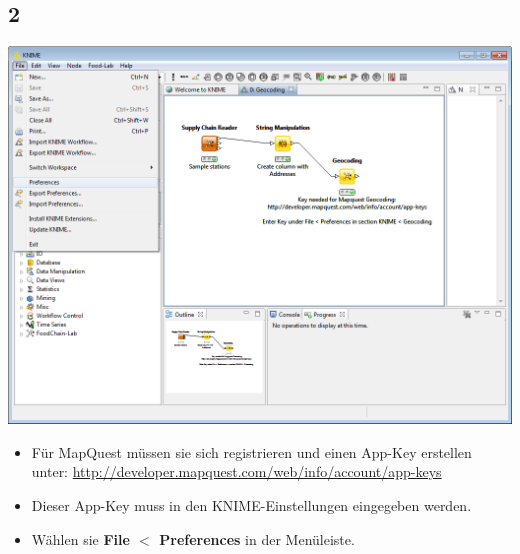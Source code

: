 \documentclass{beamer}
\begin{document}
\subsection{2}
\begin{frame}
	\begin{center}
  		\includegraphics[height=0.6\textheight]{2.png}
	\end{center}
	\begin{itemize}		
		\item Für MapQuest müssen sie sich registrieren und einen App-Key erstellen unter: \url{http://developer.mapquest.com/web/info/account/app-keys}
		\item Dieser App-Key muss in den KNIME-Einstellungen eingegeben werden.
		\item Wählen sie \textbf{File $<$ Preferences} in der Menüleiste.
	\end{itemize}
\end{frame}
\end{document}
